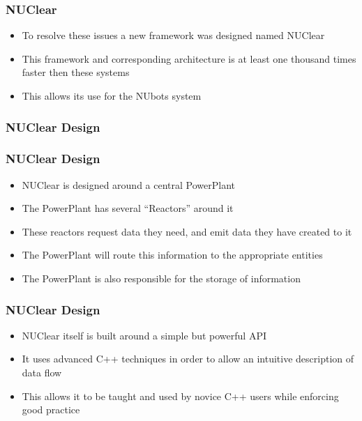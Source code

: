 \documentclass{beamer}
\begin{document}
\begin{frame}
	\frametitle{NUClear}
	\begin{itemize}
		\item To resolve these issues a new framework was designed named NUClear
		\item This framework and corresponding architecture is at least one thousand times faster then these systems
		\item This allows its use for the NUbots system
	\end{itemize}
\end{frame}

\begin{frame}
	\frametitle{NUClear Design}
	\centering
\end{frame}

\begin{frame}
	\frametitle{NUClear Design}
	\begin{itemize}
		\item NUClear is designed around a central PowerPlant
		\item The PowerPlant has several ``Reactors'' around it
		\item These reactors request data they need, and emit data they have created to it
		\item The PowerPlant will route this information to the appropriate entities
		\item The PowerPlant is also responsible for the storage of information
	\end{itemize}
\end{frame}

\begin{frame}
	\frametitle{NUClear Design}
	\begin{itemize}
		\item NUClear itself is built around a simple but powerful API
		\item It uses advanced C++ techniques in order to allow an intuitive description of data flow
		\item This allows it to be taught and used by novice C++ users while enforcing good practice
	\end{itemize}
\end{frame}
\end{document}
